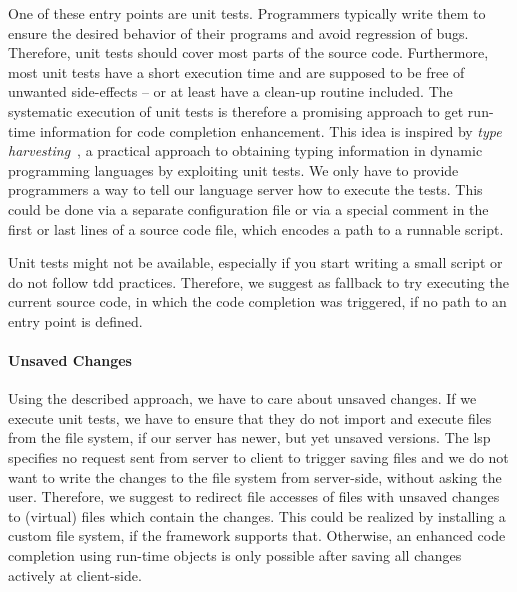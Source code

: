\documentclass[sigplan,10pt,review,anonymous]{acmart}
\begin{document}
    One of these entry points are unit tests. Programmers typically write them to ensure the desired behavior of their programs and avoid regression of bugs. Therefore, unit tests should cover most parts of the source code. Furthermore, most unit tests have a short execution time and are supposed to be free of unwanted side-effects -- or at least have a clean-up routine included. The systematic execution of unit tests is therefore a promising approach to get run-time information for code completion enhancement. This idea is inspired by \emph{type harvesting}~\cite{haupt2011type}, a practical approach to obtaining typing information in dynamic programming languages by exploiting unit tests. We only have to provide programmers a way to tell our language server how to execute the tests. This could be done via a separate configuration file or via a special comment in the first or last lines of a source code file, which encodes a path to a runnable script.

    Unit tests might not be available, especially if you start writing a small script or do not follow \ac{tdd} practices. Therefore, we suggest as fallback to try executing the current source code, in which the code completion was triggered, if no path to an entry point is defined.

    \paragraph{Unsaved Changes}
    Using the described approach, we have to care about unsaved changes. If we execute unit tests, we have to ensure that they do not import and execute files from the file system, if our server has newer, but yet unsaved versions. The \ac{lsp} specifies no request sent from server to client to trigger saving files and we do not want to write the changes to the file system from server-side, without asking the user. Therefore, we suggest to redirect file accesses of files with unsaved changes to (virtual) files which contain the changes. This could be realized by installing a custom file system, if the framework supports that. Otherwise, an enhanced code completion using run-time objects is only possible after saving all changes actively at client-side.
\end{document}
